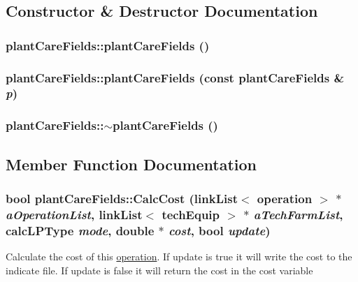 \subsection{Constructor \& Destructor Documentation}
\hypertarget{classplant_care_fields_ac0019b8e6264ef0ddfa4e7470ab78a47}{
\subsubsection[{plantCareFields}]{\setlength{\rightskip}{0pt plus 5cm}plantCareFields::plantCareFields ()}}
\label{classplant_care_fields_ac0019b8e6264ef0ddfa4e7470ab78a47}
\hypertarget{classplant_care_fields_a1f59456f19d39adae604e13b5bc2e9d0}{
\subsubsection[{plantCareFields}]{\setlength{\rightskip}{0pt plus 5cm}plantCareFields::plantCareFields (const {\bf plantCareFields} \& {\em p})}}
\label{classplant_care_fields_a1f59456f19d39adae604e13b5bc2e9d0}
\hypertarget{classplant_care_fields_a0b65b66f22596fd0742bb89c891069a1}{
\subsubsection[{$\sim$plantCareFields}]{\setlength{\rightskip}{0pt plus 5cm}plantCareFields::$\sim$plantCareFields ()}}
\label{classplant_care_fields_a0b65b66f22596fd0742bb89c891069a1}


\subsection{Member Function Documentation}
\hypertarget{classplant_care_fields_a14bb648891c128209ae40889534b4257}{
\subsubsection[{CalcCost}]{\setlength{\rightskip}{0pt plus 5cm}bool plantCareFields::CalcCost ({\bf linkList}$<$ {\bf operation} $>$ $\ast$ {\em aOperationList}, \/  {\bf linkList}$<$ {\bf techEquip} $>$ $\ast$ {\em aTechFarmList}, \/  {\bf calcLPType} {\em mode}, \/  double $\ast$ {\em cost}, \/  bool {\em update})}}
\label{classplant_care_fields_a14bb648891c128209ae40889534b4257}
Calculate the cost of this \hyperlink{classoperation}{operation}. If update is true it will write the cost to the indicate file. If update is false it will return the cost in the cost variable 

